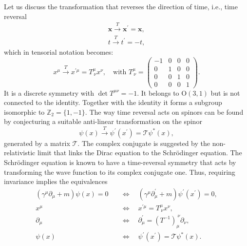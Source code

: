 Let us discuss the transformation that reverses the direction of time, i.e., time reversal
\[
    \begin{aligned}
        \mathbf{x} \xrightarrow{T} \mathbf{x}^{\prime} = \mathbf{x}, \\
        t \xrightarrow{T} t^{\prime} = -t,
    \end{aligned}
\]
which in tensorial notation becomes:
\begin{equation}
    x^{\mu} \xrightarrow{T} x^{\prime \mu} = T^{\mu}_{\ \nu} x^{\nu}, \quad \text{with } T^{\mu}_{\ \nu} = \begin{pmatrix}
        -1 & 0 & 0 & 0 \\
        0  & 1 & 0 & 0 \\
        0  & 0 & 1 & 0 \\
        0  & 0 & 0 & 1
    \end{pmatrix}.
    \label{eq:time_rehersal_transformation}
\end{equation}
It is a discrete symmetry with \(\det T^{\mu \nu} = -1\). It belongs to \(\mathrm{O}(3,1)\) but is not connected to the identity. Together with the identity it forms a subgroup isomorphic to \(\mathbb{Z}_2 = \{1,-1\}\). The way time reversal acts on spinors can be found by conjecturing a suitable anti-linear transformation on the spinor
\[
    \psi(x) \xrightarrow{T} \psi^{\prime}(x^{\prime}) = \mathcal{T} \psi^*(x),
\]
generated by a matrix \(\mathcal{T}\). The complex conjugate is suggested by the non-relativistic limit that links the Dirac equation to the Schrödinger equation. The Schrödinger equation is known to have a time-reversal symmetry that acts by transforming the wave function to its complex conjugate one. Thus, requiring invariance implies the equivalences
\[
    \begin{aligned}
        \left(\gamma^{\mu} \partial_\mu + m \right) \psi(x) = 0 & \quad \iff \quad \left(\gamma^{\mu} \partial_\mu^{\prime} + m \right) \psi^{\prime} (x^{\prime}) = 0, \\
        x^{\mu}                                                 & \quad \iff \quad x^{\prime \mu} = T^{\mu}_{\ \nu} x^{\nu},                                            \\
        \partial_{\mu}                                          & \quad \iff \quad \partial_{\mu}^{\prime} = \left(T^{-1}\right)_{\mu}^{\ \nu} \partial_{\nu},          \\
        \psi(x)                                                 & \quad \iff \quad \psi^{\prime}(x^{\prime}) = \mathcal{T} \psi^*(x).
    \end{aligned}
\]
